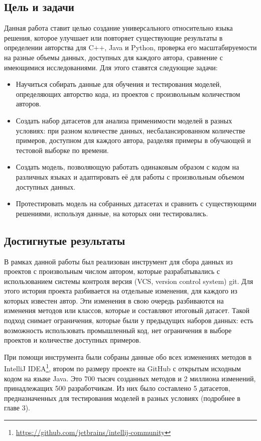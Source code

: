 \subsection*{Цель и задачи}
Данная работа ставит целью создание универсального относительно языка решения, которое улучшает или повторяет существующие результаты в определении авторства для C++, Java и Python, проверка его масштабируемости на разные объемы данных, доступных для каждого автора, сравнение с имеющимися исследованиями. Для этого ставятся следующие задачи:
\begin{itemize}
    \item Научиться собирать данные для обучения и тестирования моделей, определяющих авторство кода, из проектов с произвольным количеством авторов.
    \item Создать набор датасетов для анализа применимости моделей в разных условиях: при разном количестве данных, несбалансированном количестве примеров, доступном для каждого автора, разделяя примеры в обучающей и тестовой выборке по времени.
    \item Создать модель, позволяющую работать одинаковым образом с кодом на различных языках и адаптировать её для работы с произвольным объемом доступных данных.
    \item Протестировать модель на собранных датасетах и сравнить с существующими решениями, используя данные, на которых они тестировались.
\end{itemize}

\subsection*{Достигнутые результаты}
В рамках данной работы был реализован инструмент для сбора данных из проектов с произвольным числом автором, которые разрабатывались с использованием системы контроля версия (VCS, version control system) git. Для этого история проекта разбивается на отдельные изменения, для каждого из которых известен автор. Эти изменения в свою очередь разбиваются на изменения методов или классов, которые и составляют итоговый датасет. Такой подход снимает ограничения, которые были у предыдущих наборов данных: есть возможность использовать промышленный код, нет ограничения в выборе проектов и количестве доступных примеров.

При помощи инструмента были собраны данные обо всех изменениях методов в IntelliJ IDEA\footnote{\url{https://github.com/jetbrains/intellij-community}}, втором по размеру проекте на GitHub с открытым исходным кодом на языке Java. Это 700 тысяч созданных методов и 2 миллиона изменений, принадлежащих 500 разработчикам. Из них было составлено 5 датасетов, предназначенных для тестирования моделей в разных условиях (подробнее в главе 3).

